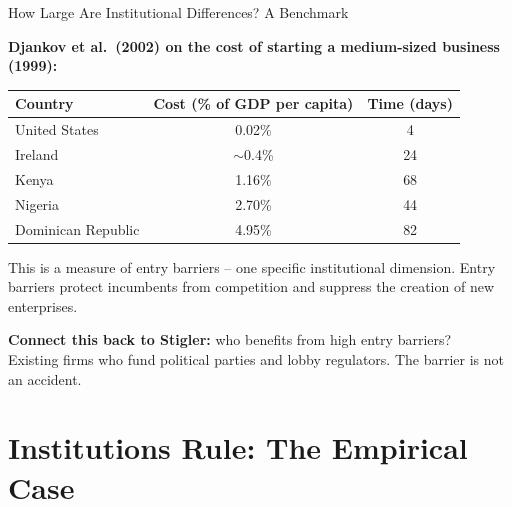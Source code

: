 \documentclass[10pt]{beamer}
\begin{document}
\begin{frame}[allowframebreaks]{How Large Are Institutional Differences? A Benchmark}

\textbf{Djankov et al.\ (2002) on the cost of starting a medium-sized business (1999):}


\begin{center}
\begin{tabular}{lcc}
\toprule
\textbf{Country} & \textbf{Cost (\% of GDP per capita)} & \textbf{Time (days)} \\
\midrule
United States & 0.02\% & 4 \\
Ireland & $\sim$0.4\% & 24 \\
Kenya & 1.16\% & 68 \\
Nigeria & 2.70\% & 44 \\
Dominican Republic & 4.95\% & 82 \\
\bottomrule
\end{tabular}
\end{center}


This is a measure of \alert{entry barriers} -- one specific institutional dimension.
Entry barriers protect incumbents from competition and suppress the creation of new enterprises.


\textbf{Connect this back to Stigler:} who benefits from high entry barriers? \\
Existing firms who fund political parties and lobby regulators. The barrier is not an accident.
\end{frame}



\section{Institutions Rule: The Empirical Case}
\end{document}
